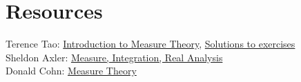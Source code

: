 \documentclass[answers,12pt]{exam}
\begin{document}
\section{Resources}
Terence Tao: \href{https://terrytao.files.wordpress.com/2012/12/gsm-126-tao5-measure-book.pdf}{Introduction to Measure Theory}, \href{https://math.solverer.com/library/terence_tao/an_introduction_to_measure_theory}{Solutions to exercises}\\
Sheldon Axler: \href{https://measure.axler.net/MIRA.pdf}{Measure, Integration, Real Analysis}\\
Donald Cohn: \href{https://www.fayoum.edu.eg/stfsys/stfFiles/273/1342/Measure%20Theory%20(2nd%20ed.)%20-%20Cohn,%20Donald%20L._5990.pdf}{Measure Theory}
\end{document}
